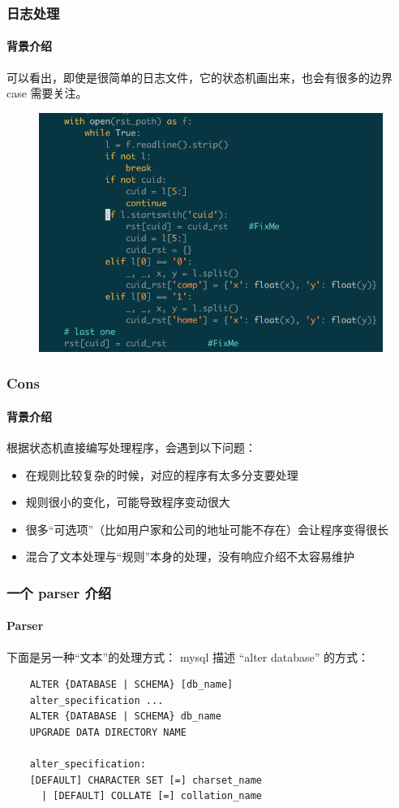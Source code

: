 \begin{frame}[fragile]
  \frametitle{日志处理}
  \framesubtitle{背景介绍}
  可以看出，即使是很简单的日志文件，它的状态机画出来，也会有很多的边界 case 需要关注。
  \begin{figure}[htbp]
    \centering
    \includegraphics[scale=.3]{imgs/py-regular.png}
  \end{figure}
\end{frame}

\begin{frame}[fragile]
  \frametitle{Cons}
  \framesubtitle{背景介绍}
  根据状态机直接编写处理程序，会遇到以下问题：
  
  \begin{itemize}
  \item 在规则比较复杂的时候，对应的程序有太多分支要处理
  \item 规则很小的变化，可能导致程序变动很大
  \item 很多“可选项”（比如用户家和公司的地址可能不存在）会让程序变得很长
  \item 混合了文本处理与“规则”本身的处理，没有响应介绍不太容易维护
  \end{itemize}
\end{frame}

\begin{frame}[fragile]
  \frametitle{一个 parser 介绍}
  \framesubtitle{Parser}
  下面是另一种“文本”的处理方式： mysql 描述 ``alter database'' 的方式：
  
  \begin{verbatim}
    ALTER {DATABASE | SCHEMA} [db_name]
    alter_specification ...
    ALTER {DATABASE | SCHEMA} db_name
    UPGRADE DATA DIRECTORY NAME

    alter_specification:
    [DEFAULT] CHARACTER SET [=] charset_name
      | [DEFAULT] COLLATE [=] collation_name
  \end{verbatim}
\end{frame}

